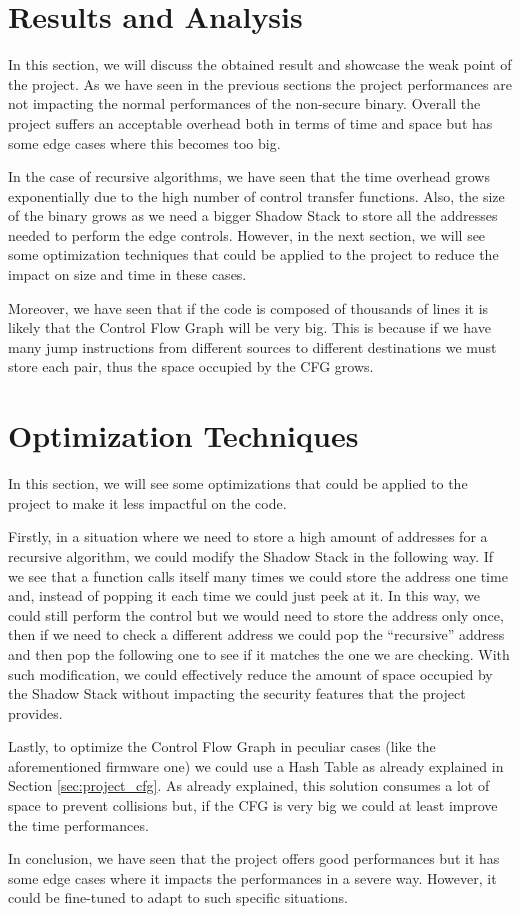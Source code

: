 \section{Results and Analysis}
\label{sec:pa_results}

In this section, we will discuss the obtained result and showcase the weak point
of the project. As we have seen in the previous sections the project
performances are not impacting the normal performances of the non-secure binary.
Overall the project suffers an acceptable overhead both in terms of time and space
but has some edge cases where this becomes too big.

In the case of recursive algorithms, we have seen that the time overhead grows
exponentially due to the high number of control transfer functions. Also, the
size of the binary grows as we need a bigger Shadow Stack to store all the
addresses needed to perform the edge controls. However, in the next section, we will
see some optimization techniques that could be applied to the project to reduce the
impact on size and time in these cases.

Moreover, we have seen that if the code is composed of thousands of lines it is
likely that the Control Flow Graph will be very big. This is because if we have many
jump instructions from different sources to different destinations we must store
each pair, thus the space occupied by the CFG grows.

\section{Optimization Techniques}
\label{sec:pa_optimization}

In this section, we will see some optimizations that could be applied to the
project to make it less impactful on the code.

Firstly, in a situation where we need to store a high amount of addresses for a recursive
algorithm, we could modify the Shadow Stack in the following way. If we see that
a function calls itself many times we could store the address one time and,
instead of popping it each time we could just peek at it. In this way, we could
still perform the control but we would need to store the address only once, then
if we need to check a different address we could pop the ``recursive'' address and
then pop the following one to see if it matches the one we are checking. With
such modification, we could effectively reduce the amount of space occupied by the
Shadow Stack without impacting the security features that the project provides.

Lastly, to optimize the Control Flow Graph in peculiar cases (like the aforementioned
firmware one) we could use a Hash Table as already explained in Section
\ref{sec:project_cfg}. As already explained, this solution consumes a lot of
space to prevent collisions but, if the CFG is very big we could at least improve
the time performances.

In conclusion, we have seen that the project offers good performances but it has
some edge cases where it impacts the performances in a severe way. However, it
could be fine-tuned to adapt to such specific situations.